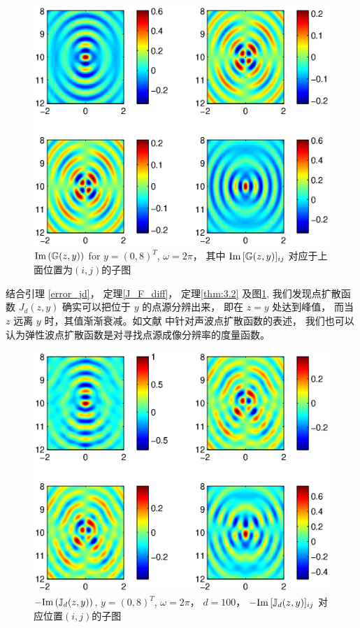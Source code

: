 \begin{figure}[htbp]
	\centering
	\includegraphics[width=\textwidth]{./Img/graphic/green_om_2_lm_5_mu_25_im.eps}	
	\caption{$\mathrm{Im}\,(\mathbb{G}(z,y))$ for $y=(0,8)^T$, $\omega=2\pi$， 其中 $\mathrm{Im}\, [\mathbb{G}(z,y)]_{ij}$ 对应于上面位置为$(i,j)$的子图}\label{figure_psf}
\end{figure}

结合引理 \ref{error_jd}， 定理\ref{J_F_diff}， 定理\ref{thm:3.2} 及图\ref{figure_psf}, 我们发现点扩散函数 $J_d(z,y)$ 确实可以把位于 $y$ 的点源分辨出来， 即在 $z=y$ 处达到峰值， 而当 $z$ 远离 $y$ 时，其值渐渐衰减。如文献 \cite{RTMhalf_aco} 中针对声波点扩散函数的表述， 我们也可以认为弹性波点扩散函数是对寻找点源成像分辨率的度量函数。

\begin{figure}[htbp]
	\centering
	\includegraphics[width=\textwidth]{./Img/graphic/psf_om_2_lm_5_mu_25_im.eps}	
	\caption{$-\mathrm{Im}\,(\mathbb{J}_d(z,y))$, $y=(0,8)^T$, $\omega=2\pi$， $d=100$， $-\mathrm{Im}\, [\mathbb{J}_d(z,y)]_{ij}$ 对应位置$(i,j)$的子图 }\label{figure_green}
\end{figure}

